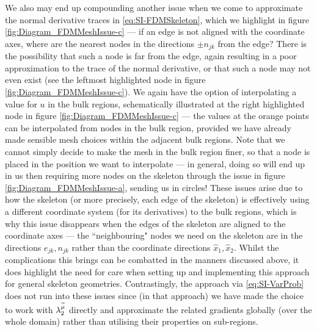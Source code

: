 We also may end up compounding another issue when we come to approximate the normal derivative traces in \eqref{eq:SI-FDMSkeleton}, which we highlight in figure \ref{fig:Diagram_FDMMeshIssue-c} --- if an edge is not aligned with the coordinate axes, where are the nearest nodes in the directions $\pm n_{jk}$ from the edge?
There is the possibility that such a node is far from the edge, again resulting in a poor approximation to the trace of the normal derivative, or that such a node may not even exist (see the leftmost highlighted node in figure \ref{fig:Diagram_FDMMeshIssue-c}).
We again have the option of interpolating a value for $u$ in the bulk regions, schematically illustrated at the right highlighted node in figure \ref{fig:Diagram_FDMMeshIssue-c} --- the values at the orange points can be interpolated from nodes in the bulk region, provided we have already made sensible mesh choices within the adjacent bulk regions.
Note that we cannot simply decide to make the mesh in the bulk region finer, so that a node is placed in the position we want to interpolate --- in general, doing so will end up in us then requiring more nodes on the skeleton through the issue in figure \ref{fig:Diagram_FDMMeshIssue-a}, sending us in circles!
These issues arise due to how the skeleton (or more precisely, each edge of the skeleton) is effectively using a different coordinate system (for its derivatives) to the bulk regions, which is why this issue disappears when the edges of the skeleton are aligned to the coordinate axes --- the ``neighbouring" nodes we need on the skeleton are in the directions $e_{jk}, n_{jk}$ rather than the coordinate directions $\widehat{x}_1, \widehat{x}_2$.
Whilst the complications this brings can be combatted in the manners discussed above, it does highlight the need for care when setting up and implementing this approach for general skeleton geometries.
Contrastingly, the approach via \eqref{eq:SI-VarProb} does not run into these issues since (in that approach) we have made the choice to work with $\lambda_2^{\widetilde{\mu}}$ directly and approximate the related gradients globally (over the whole domain) rather than utilising their properties on sub-regions.